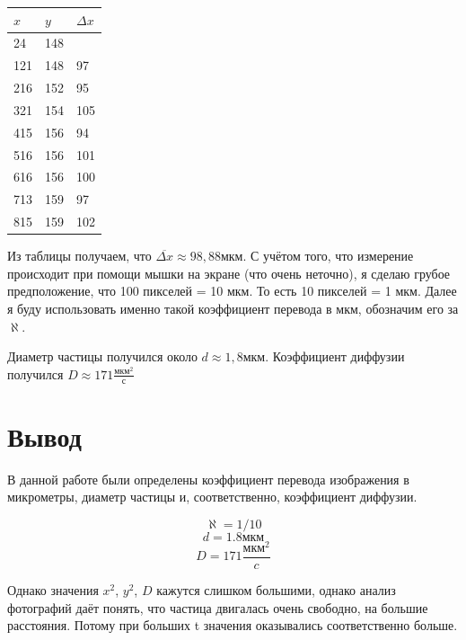 \documentclass[a4paper,14pt]{article}
\begin{document}
\begin{table}[!ht]
    \centering
    \begin{tabular}{|l|l|l|}
    \hline
        $x$ & $y$ & $\Delta x$ \\ \hline
        24  & 148 &  \\ \hline
        121 & 148 & 97 \\ \hline
        216 & 152 & 95 \\ \hline
        321 & 154 & 105 \\ \hline
        415 & 156 & 94 \\ \hline
        516 & 156 & 101 \\ \hline
        616 & 156 & 100 \\ \hline
        713 & 159 & 97 \\ \hline
        815 & 159 & 102 \\ \hline
    \end{tabular}
\end{table}

Из таблицы получаем, что $\overline{\Delta x} \approx 98,88 мкм$. С учётом того, что измерение происходит при помощи мышки на экране (что очень неточно), я сделаю грубое предположение, что 100 пикселей = 10 мкм. То есть 10 пикселей = 1 мкм. Далее я буду использовать именно такой коэффициент перевода в мкм, обозначим его за $\aleph$.

Диаметр частицы получился около $d\approx1,8$мкм.
Коэффициент диффузии получился $D\approx171\frac{мкм^2}{с}$

\section{Вывод}

В данной работе были определены коэффициент перевода изображения в микрометры, диаметр частицы и, соответственно, коэффициент диффузии.

$$
\aleph = 1/10
$$
$$
d = 1.8 мкм
$$
$$
D = 171 \frac{мкм^2}{c}
$$

Однако значения $x^2$, $y^2$, $D$ кажутся слишком большими, однако анализ фотографий даёт понять, что частица двигалась очень свободно, на большие  расстояния. Потому при больших t значения оказывались соответственно больше.
\end{document}
